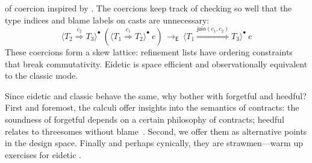 \documentclass[9pt]{extarticle}
\newcommand{\ottnt}[1]{\mathit{#1}}
\begin{document}
of coercion inspired by \citet{Greenberg13thesis}. The coercions keep
track of checking so well that the type indices and blame labels on casts are
unnecessary:
\[  \langle  \ottnt{T_{{\mathrm{2}}}}  \mathord{ \overset{ \ottnt{c_{{\mathrm{2}}}} }{\Rightarrow} }  \ottnt{T_{{\mathrm{3}}}}  \rangle^{ \bullet } ~   (  \langle  \ottnt{T_{{\mathrm{1}}}}  \mathord{ \overset{ \ottnt{c_{{\mathrm{1}}}} }{\Rightarrow} }  \ottnt{T_{{\mathrm{2}}}}  \rangle^{ \bullet } ~  \ottnt{e}  )   \,  \longrightarrow _{  \mathsf{E}  }  \,  \langle  \ottnt{T_{{\mathrm{1}}}}  \mathord{ \overset{  \mathsf{join} ( \ottnt{c_{{\mathrm{1}}}} , \ottnt{c_{{\mathrm{2}}}} )  }{\Rightarrow} }  \ottnt{T_{{\mathrm{3}}}}  \rangle^{ \bullet } ~  \ottnt{e}  \]
These coercions form a skew lattice: refinement lists have ordering
constraints that break commutativity.
Eidetic \lambdah is space efficient and observationally equivalent to
the classic mode.

{\iffull
Since eidetic and classic \lambdah behave the same, why bother with
forgetful and heedful?
First and foremost, the calculi offer insights into the semantics of
contracts\iffull: the soundness of forgetful \lambdah depends on a certain
philosophy of contracts; heedful \lambdah relates to threesomes
without blame~\cite{Siek10threesomes}\fi.
Second, we offer them as alternative points in the design space.
Finally and perhaps cynically, they are strawmen---warm up exercises
for eidetic \lambdah.
\fi}

\medskip
\end{document}
